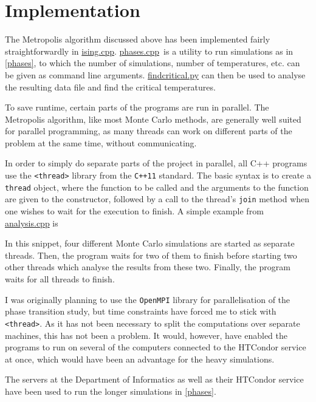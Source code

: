 \documentclass[12pt,english,a4paper]{article}
\newcommand{\program}[1]{\href{https://github.com/anjohan/Offentlig/blob/master/FYS3150/Oblig4/#1}{#1}}
\begin{document}
\section{Implementation}
The Metropolis algorithm discussed above has been implemented fairly straightforwardly in \program{ising.cpp}. \program{phases.cpp} is a utility to run simulations as in \ref{phases}, to which the number of simulations, number of temperatures, etc. can be given as command line arguments. \program{findcritical.py} can then be used to analyse the resulting data file and find the critical temperatures.

To save runtime, certain parts of the programs are run in parallel. The Metropolis algorithm, like most Monte Carlo methods, are generally well suited for parallel programming, as many threads can work on different parts of the problem at the same time, without communicating.

In order to simply do separate parts of the project in parallel, all C++ programs use the \texttt{<thread>} library from the \texttt{C++11} standard. The basic syntax is to create a \texttt{thread} object, where the function to be called and the arguments to the function are given to the constructor, followed by a call to the thread's \texttt{join} method when one wishes to wait for the execution to finish. A simple example from \program{analysis.cpp} is

In this snippet, four different Monte Carlo simulations are started as separate threads. Then, the program waits for two of them to finish before starting two other threads which analyse the results from these two. Finally, the program waits for all threads to finish.

I was originally planning to use the \texttt{OpenMPI} library for parallelisation of the phase transition study, but time constraints have forced me to stick with \texttt{<thread>}. As it has not been necessary to split the computations over separate machines, this has not been a problem. It would, however, have enabled the programs to run on several of the computers connected to the HTCondor service at once, which would have been an advantage for the heavy simulations.

The servers at the Department of Informatics as well as their HTCondor service have been used to run the longer simulations in \ref{phases}.

\clearpage
\end{document}
